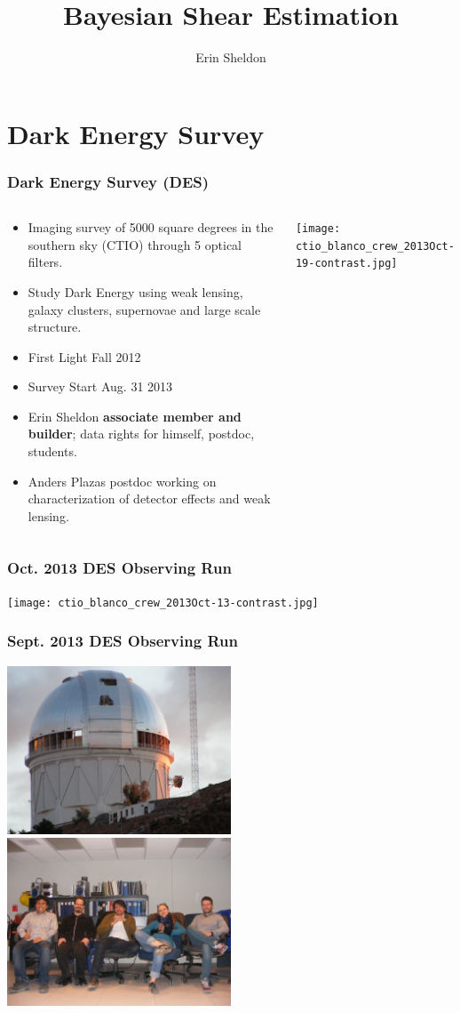 \documentclass{beamer}
\title{Bayesian Shear Estimation}
\author{Erin Sheldon}
\institute{Brookhaven National Laboratory}
\begin{document}

\section{Dark Energy Survey}

\frame
{
    \frametitle{Dark Energy Survey (DES)}

    \fontsize{9}{0.8\baselineskip}
    \begin{columns}
        \begin{column}{0.5\textwidth}    
            \begin{itemize}
                \item Imaging survey of 5000 square degrees in the 
                    southern sky (CTIO) through 5 optical filters.
                \item Study Dark Energy using weak lensing, galaxy clusters, supernovae
                    and large scale structure.
                \item First Light Fall 2012
                \item Survey Start Aug. 31 2013
                \item Erin Sheldon {\bf associate member and builder}; data rights for
                    himself, postdoc, students.
                \item Anders Plazas postdoc working on characterization of detector
                    effects and weak lensing.
            \end{itemize}
        \end{column}
        \begin{column}{0.5\textwidth}
            \texttt{[image: ctio\_blanco\_crew\_2013Oct-19-contrast.jpg]}
        \end{column}
    \end{columns}
}
\frame
{
    \frametitle{Oct. 2013 DES Observing Run}

    \texttt{[image: ctio\_blanco\_crew\_2013Oct-13-contrast.jpg]}
}
\frame
{
    \frametitle{Sept. 2013 DES Observing Run}

    \includegraphics[width=0.5\textwidth]{plazas-blanco-ctio.jpg}
    \includegraphics[width=0.5\textwidth]{plazas-group-ctio.jpg}
}
\end{document}
